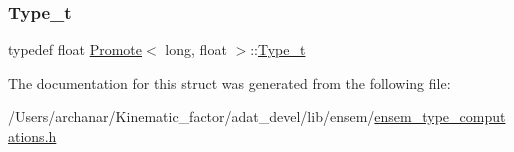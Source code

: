 \subsubsection{\texorpdfstring{Type\_t}{Type\_t}\hspace{0.1cm}{\footnotesize\ttfamily [2/2]}}
{\footnotesize\ttfamily typedef float \mbox{\hyperlink{structPromote}{Promote}}$<$ long, float $>$\+::\mbox{\hyperlink{structPromote_3_01long_00_01float_01_4_adf8f8e314d4cc953a8bec5fad1b5a495}{Type\+\_\+t}}}



The documentation for this struct was generated from the following file\+:\begin{DoxyCompactItemize}
\item 
/\+Users/archanar/\+Kinematic\+\_\+factor/adat\+\_\+devel/lib/ensem/\mbox{\hyperlink{lib_2ensem_2ensem__type__computations_8h}{ensem\+\_\+type\+\_\+computations.\+h}}\end{DoxyCompactItemize}
